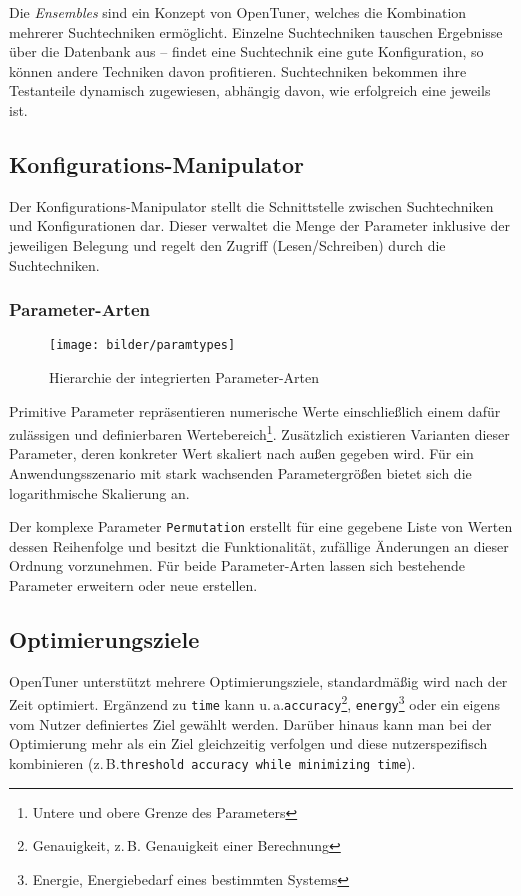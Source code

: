 \documentclass[a4paper,11pt]{scrartcl}
\newcommand{\zB}{\mbox{z.\,B.}\xspace}
\newcommand{\ua}{\mbox{u.\,a.}\xspace}
\begin{document}
Die \emph{Ensembles} sind ein Konzept von OpenTuner, welches die Kombination mehrerer Suchtechniken
ermöglicht. Einzelne Suchtechniken tauschen Ergebnisse über die Datenbank aus -- findet eine 
Suchtechnik eine gute Konfiguration, so können andere Techniken davon profitieren.
Suchtechniken bekommen ihre Testanteile dynamisch zugewiesen, abhängig davon, wie erfolgreich eine
jeweils ist.

\subsection{Konfigurations-Manipulator}
Der Konfigurations-Manipulator stellt die Schnittstelle zwischen Suchtechniken und Konfigurationen
dar. Dieser verwaltet die Menge der Parameter inklusive der jeweiligen Belegung und regelt den Zugriff
(Lesen/Schreiben) durch die Suchtechniken.

\subsubsection{Parameter-Arten}

\begin{figure}[h]
\begin{center}
\texttt{[image: bilder/paramtypes]}
\cite[S.~5]{OT-paper} \caption{Hierarchie der integrierten Parameter-Arten} 
\end{center}
\end{figure}

Primitive Parameter repräsentieren numerische Werte einschließlich einem dafür
zulässigen und definierbaren Wertebereich\footnote{Untere und obere Grenze des Parameters}. 
Zusätzlich existieren Varianten dieser Parameter,
deren konkreter Wert skaliert nach außen gegeben wird. Für ein Anwendungsszenario mit 
stark wachsenden Parametergrößen bietet sich die logarithmische Skalierung an. \newline

Der komplexe Parameter \texttt{Permutation} erstellt für eine gegebene Liste von Werten dessen 
Reihenfolge und besitzt die Funktionalität, zufällige Änderungen an dieser Ordnung vorzunehmen.
Für beide Parameter-Arten lassen sich bestehende Parameter erweitern oder neue erstellen.

\subsection{Optimierungsziele}

OpenTuner unterstützt mehrere Optimierungsziele, standardmäßig wird nach der Zeit optimiert.
Ergänzend zu \texttt{time} kann \ua \texttt{accuracy}\footnote{Genauigkeit, \zB Genauigkeit einer Berechnung}, 
\texttt{energy}\footnote{Energie, Energiebedarf eines bestimmten Systems} oder ein eigens vom 
Nutzer definiertes Ziel gewählt werden.
Darüber hinaus kann man bei der Optimierung mehr als ein Ziel gleichzeitig verfolgen und
diese nutzerspezifisch kombinieren (\zB \texttt{threshold accuracy  while
minimizing time}). 
\end{document}
